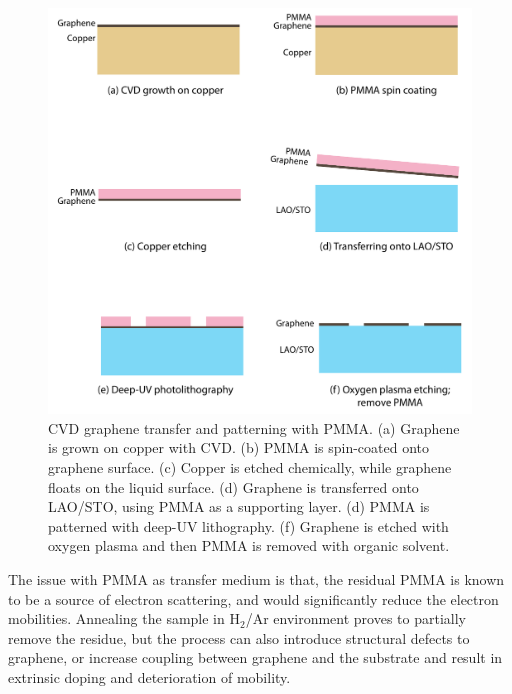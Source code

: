 \documentclass[pdflatex, sectionletters, 12pt]{pittetd}    %
\begin{document}
\begin{figure}[p]
	\centering
	\includegraphics[width=.90\textwidth]{Drawing/PMMATransfer.pdf}
	\caption{CVD graphene transfer and patterning with PMMA. (a) Graphene is grown on copper with CVD. (b) PMMA is spin-coated onto graphene surface. (c) Copper is etched chemically, while graphene floats on the liquid surface. (d) Graphene is transferred onto LAO/STO, using PMMA as a supporting layer. (d) PMMA is patterned with deep-UV lithography. (f) Graphene is etched with oxygen plasma and then PMMA is removed with organic solvent.}
	\label{FIG:PMMATransfer}
\end{figure}

The issue with PMMA as transfer medium is that, the residual PMMA is known to be a source of electron scattering, and would significantly reduce the electron mobilities\cite{pirkle2011effect, lin2011graphene, cheng2011toward}. Annealing the sample in H$_2$/Ar environment proves to partially remove the residue, but the process can also introduce structural defects to graphene\cite{lin2011graphene}, or increase coupling between graphene and the substrate and result in extrinsic doping and deterioration of mobility\cite{cheng2011toward}. 
\\
\end{document}

